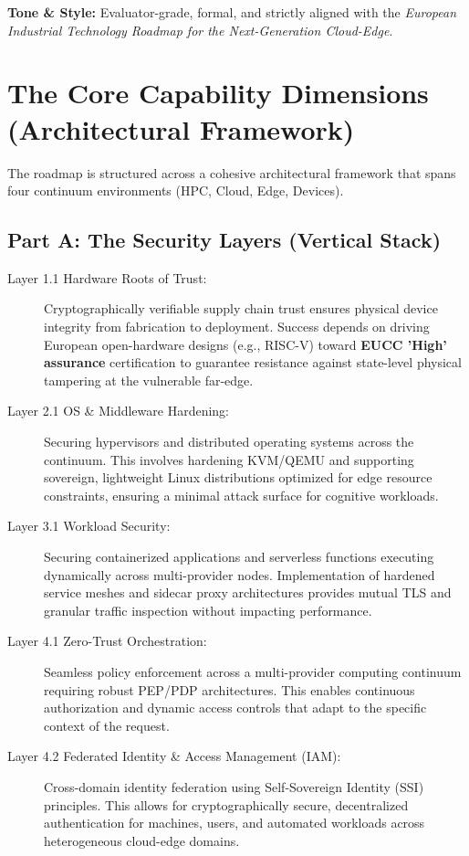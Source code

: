 \documentclass[12pt,a4paper]{article}
\begin{document}
\noindent\textbf{Tone \& Style:} Evaluator-grade, formal, and strictly aligned with the \textit{European Industrial Technology Roadmap for the Next-Generation Cloud-Edge}.


\section{The Core Capability Dimensions (Architectural Framework)}
The roadmap is structured across a cohesive architectural framework that spans four continuum environments (HPC, Cloud, Edge, Devices).

\subsection*{Part A: The Security Layers (Vertical Stack)}
\begin{description}
\item[Layer 1.1 Hardware Roots of Trust:] Cryptographically verifiable supply chain trust ensures physical device integrity from fabrication to deployment. Success depends on driving European open-hardware designs (e.g., RISC-V) toward \textbf{EUCC 'High' assurance} certification \cite{eucc} to guarantee resistance against state-level physical tampering at the vulnerable far-edge.

\item[Layer 2.1 OS \& Middleware Hardening:] Securing hypervisors and distributed operating systems across the continuum. This involves hardening KVM/QEMU and supporting sovereign, lightweight Linux distributions optimized for edge resource constraints, ensuring a minimal attack surface for cognitive workloads.

\item[Layer 3.1 Workload Security:] Securing containerized applications and serverless functions executing dynamically across multi-provider nodes. Implementation of hardened service meshes and sidecar proxy architectures provides mutual TLS and granular traffic inspection without impacting performance.

\item[Layer 4.1 Zero-Trust Orchestration:] Seamless policy enforcement across a multi-provider computing continuum requiring robust PEP/PDP architectures. This enables continuous authorization and dynamic access controls that adapt to the specific context of the request.

\item[Layer 4.2 Federated Identity \& Access Management (IAM):] Cross-domain identity federation using Self-Sovereign Identity (SSI) principles. This allows for cryptographically secure, decentralized authentication for machines, users, and automated workloads across heterogeneous cloud-edge domains.


\end{description}
\end{document}
